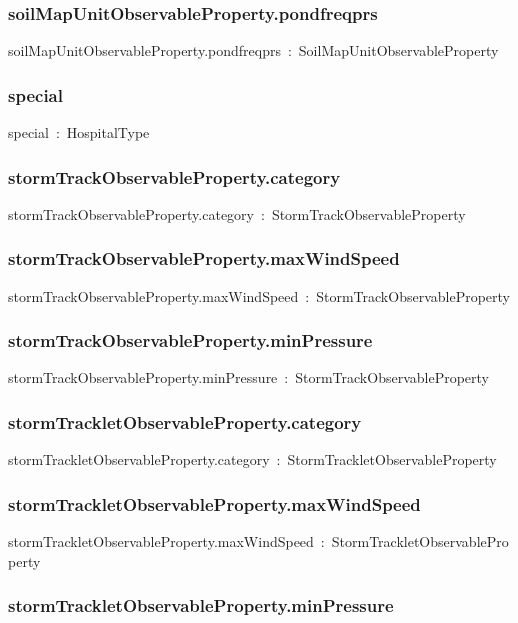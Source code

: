 \documentclass{article}
\begin{document}
\subsubsection*{soilMapUnitObservableProperty.pondfreqprs}

soilMapUnitObservableProperty.pondfreqprs~:~SoilMapUnitObservableProperty

\subsubsection*{special}

special~:~HospitalType

\subsubsection*{stormTrackObservableProperty.category}

stormTrackObservableProperty.category~:~StormTrackObservableProperty

\subsubsection*{stormTrackObservableProperty.maxWindSpeed}

stormTrackObservableProperty.maxWindSpeed~:~StormTrackObservableProperty

\subsubsection*{stormTrackObservableProperty.minPressure}

stormTrackObservableProperty.minPressure~:~StormTrackObservableProperty

\subsubsection*{stormTrackletObservableProperty.category}

stormTrackletObservableProperty.category~:~StormTrackletObservableProperty

\subsubsection*{stormTrackletObservableProperty.maxWindSpeed}

stormTrackletObservableProperty.maxWindSpeed~:~StormTrackletObservableProperty

\subsubsection*{stormTrackletObservableProperty.minPressure}
\end{document}
